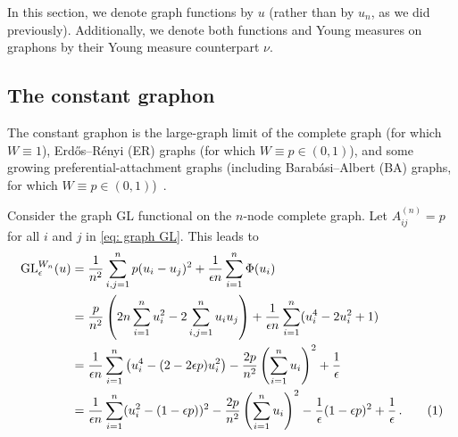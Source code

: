 \documentclass[11pt]{amsart}
\def\ep{\epsilon}
\newcommand\numberthis{\addtocounter{equation}{1}\tag{\theequation}}
\def\GL{\operatorname{GL}}
\numberwithin{equation}{section}
\begin{document}
{In this section, we denote graph functions by $u$ (rather than by $u_n$, as we did previously). Additionally, we denote both functions and Young measures on graphons by their Young measure counterpart $\nu$.




\subsection{The constant graphon} \label{sec: constant graphon}

The constant graphon is the large-graph limit of the complete graph (for which $W \equiv 1$), Erd\H{o}s--R\'{e}nyi (ER) graphs (for which $W \equiv p \in (0,1)$)\cite[Section 10.1]{lovasz2012large}, and some growing preferential-attachment graphs (including Barab\'{a}si--Albert (BA) graphs, for which $W \equiv {p \in (0,1)}$)~\cite[Example 11.44 and Proposition 11.45]{lovasz2012large}. 

Consider the graph GL functional on the $n$-node complete graph. Let $A^{(n)}_{ij} = p$ for all $i$ and $j$ in \eqref{eq: graph GL}. This leads to
\begin{align*}
    \GL^{W_n}_\ep (u) &= \frac{1}{n^2} \sum_{i,j = 1}^n p (u_i - u_j)^2 + \frac{1}{\ep n} \sum_{i = 1}^n \Phi (u_i) 
    \\
    &= \frac{p}{n^2} \left( 2n\sum_{i = 1}^n u_i^2 - 2\sum_{i,j = 1}^n u_i u_j \right) + \frac{1}{\ep n} \sum_{i = 1}^n (u_i^4 - 2u_i^2 + 1)
    \\
    &= \frac{1}{\ep n}  \sum_{i = 1}^n  \left(u_i^4 -  (2 - 2\ep p )  u_i^2\right) - \frac{2{p}}{n^2} \left(\sum_{i = 1}^n u_i\right)^2 + \frac{1}{\ep}
        \\
    &= \frac{1}{\ep n}  \sum_{i = 1}^n  (u_i^2 -  (1 - \ep p))^2 - \frac{2p}{n^2} \left(\sum_{i = 1}^n u_i \right)^2 - \frac{1}{\ep} (1 - \ep p)^2 + \frac{1}{\ep} \,. \numberthis 
    \label{eq: const discrete fnl}
\end{align*}

}
\end{document}
